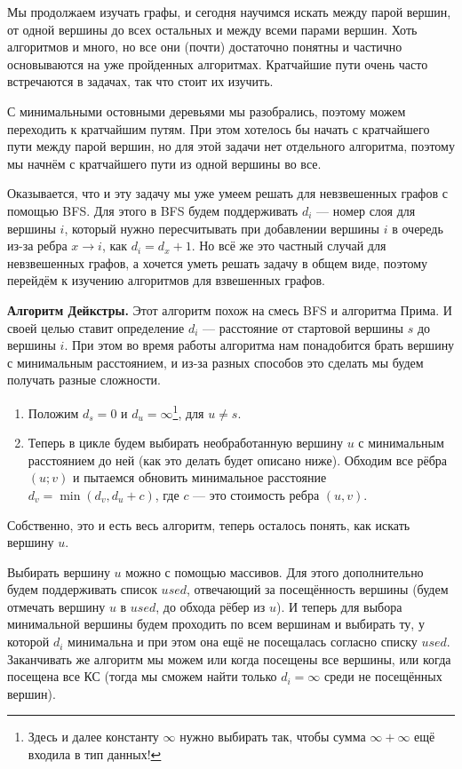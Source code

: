 Мы продолжаем изучать графы, и сегодня научимся искать  между парой вершин, от одной вершины до всех остальных и между всеми парами вершин. Хоть алгоритмов и много, но все они (почти) достаточно понятны и частично основываются на уже пройденных алгоритмах. Кратчайшие пути очень часто встречаются в задачах, так что стоит их изучить.


С минимальными остовными деревьями мы разобрались, поэтому можем переходить к кратчайшим путям. При этом хотелось бы начать с кратчайшего пути между парой вершин, но для этой задачи нет отдельного алгоритма, поэтому мы начнём с кратчайшего пути из одной вершины во все.

Оказывается, что и эту задачу мы уже умеем решать для невзвешенных графов с помощью BFS. Для этого в BFS будем поддерживать $d_i$ — номер слоя для вершины $i$, который нужно пересчитывать при добавлении вершины $i$ в очередь из-за ребра $x \to i$, как $d_i = d_x + 1$. Но всё же это частный случай для невзвешенных графов, а хочется уметь решать задачу в общем виде, поэтому перейдём к изучению алгоритмов для взвешенных графов.

\textbf{Алгоритм Дейкстры.} Этот алгоритм похож на смесь BFS и алгоритма Прима. И своей целью ставит определение $d_i$ — расстояние от стартовой вершины $s$ до вершины $i$. При этом во время работы алгоритма нам понадобится брать вершину с минимальным расстоянием, и из-за разных способов это сделать мы будем получать разные сложности.

\begin{box-algo}
    \begin{enumerate}
        \item Положим $d_s = 0$ и $d_u = \infty$\footnote{Здесь и далее константу $\infty$ нужно выбирать так, чтобы сумма $\infty + \infty$ ещё входила в тип данных!}, для $u \ne s$.
        \item Теперь в цикле будем выбирать необработанную вершину $u$ с минимальным расстоянием до ней (как это делать будет описано ниже). Обходим все рёбра $(u; v)$ и пытаемся обновить минимальное расстояние $d_v = \min(d_v, d_u + c)$, где $c$ — это стоимость ребра $(u, v)$.
    \end{enumerate}
\end{box-algo}

Собственно, это и есть весь алгоритм, теперь осталось понять, как искать вершину $u$.

Выбирать вершину $u$ можно с помощью массивов. Для этого дополнительно будем поддерживать список $used$, отвечающий за посещённость вершины (будем отмечать вершину $u$ в $used$, до обхода рёбер из $u$). И теперь для выбора минимальной вершины будем проходить по всем вершинам и выбирать ту, у которой $d_i$ минимальна и при этом она ещё не посещалась согласно списку $used$. Заканчивать же алгоритм мы можем или когда посещены все вершины, или когда посещена все КС (тогда мы сможем найти только $d_i = \infty$ среди не посещённых вершин).

